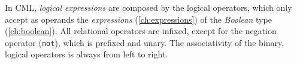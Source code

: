 In CML, \emph{logical expressions} are composed by the logical operators,
which only accept as operands the \emph{expressions} (\ref{ch:expressions})
of the \emph{Boolean} type (\ref{ch:boolean}).
All relational operators are infixed,
except for the negation operator (\verb|not|),
which is prefixed and unary.
The associativity of the binary, logical operators is always from left to right.
